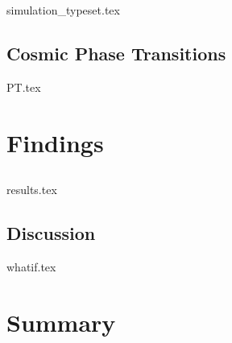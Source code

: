 \documentclass[UKenglish]{texmex/uiomasterthesis}
\begin{document}
{{simulation_typeset.tex}


\chapter{Cosmic Phase Transitions}\label{chap:PT}
    {{PT.tex}}

















\part{Findings}\label{part:findings}



\chapter{}\label{chap:results}
    {{results.tex}}


\chapter{Discussion}\label{chap:whatif}
    {{whatif.tex}}

}






\part*{Summary} %
\end{document}
